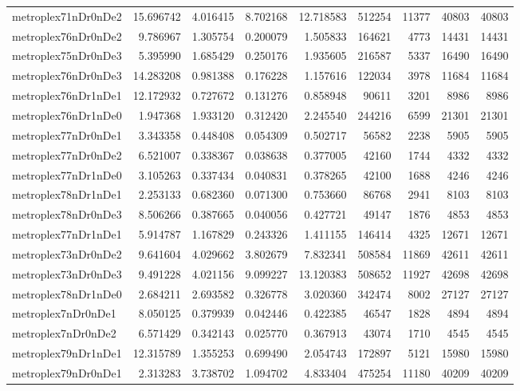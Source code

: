 \documentclass[../../../thesis.tex]{subfiles}
\begin{document}
\begin{longtable}{|l|r|r|r|r|r|r|r|r|}
metroplex71nDr0nDe2 & 15.696742 & 4.016415 & 8.702168 & 12.718583 & 512254 & 11377 & 40803 & 40803 \\
metroplex76nDr0nDe2 & 9.786967 & 1.305754 & 0.200079 & 1.505833 & 164621 & 4773 & 14431 & 14431 \\
metroplex75nDr0nDe3 & 5.395990 & 1.685429 & 0.250176 & 1.935605 & 216587 & 5337 & 16490 & 16490 \\
metroplex76nDr0nDe3 & 14.283208 & 0.981388 & 0.176228 & 1.157616 & 122034 & 3978 & 11684 & 11684 \\
metroplex76nDr1nDe1 & 12.172932 & 0.727672 & 0.131276 & 0.858948 & 90611 & 3201 & 8986 & 8986 \\
metroplex76nDr1nDe0 & 1.947368 & 1.933120 & 0.312420 & 2.245540 & 244216 & 6599 & 21301 & 21301 \\
metroplex77nDr0nDe1 & 3.343358 & 0.448408 & 0.054309 & 0.502717 & 56582 & 2238 & 5905 & 5905 \\
metroplex77nDr0nDe2 & 6.521007 & 0.338367 & 0.038638 & 0.377005 & 42160 & 1744 & 4332 & 4332 \\
metroplex77nDr1nDe0 & 3.105263 & 0.337434 & 0.040831 & 0.378265 & 42100 & 1688 & 4246 & 4246 \\
metroplex78nDr1nDe1 & 2.253133 & 0.682360 & 0.071300 & 0.753660 & 86768 & 2941 & 8103 & 8103 \\
metroplex78nDr0nDe3 & 8.506266 & 0.387665 & 0.040056 & 0.427721 & 49147 & 1876 & 4853 & 4853 \\
metroplex77nDr1nDe1 & 5.914787 & 1.167829 & 0.243326 & 1.411155 & 146414 & 4325 & 12671 & 12671 \\
metroplex73nDr0nDe2 & 9.641604 & 4.029662 & 3.802679 & 7.832341 & 508584 & 11869 & 42611 & 42611 \\
metroplex73nDr0nDe3 & 9.491228 & 4.021156 & 9.099227 & 13.120383 & 508652 & 11927 & 42698 & 42698 \\
metroplex78nDr1nDe0 & 2.684211 & 2.693582 & 0.326778 & 3.020360 & 342474 & 8002 & 27127 & 27127 \\
metroplex7nDr0nDe1 & 8.050125 & 0.379939 & 0.042446 & 0.422385 & 46547 & 1828 & 4894 & 4894 \\
metroplex7nDr0nDe2 & 6.571429 & 0.342143 & 0.025770 & 0.367913 & 43074 & 1710 & 4545 & 4545 \\
metroplex79nDr1nDe1 & 12.315789 & 1.355253 & 0.699490 & 2.054743 & 172897 & 5121 & 15980 & 15980 \\
metroplex79nDr0nDe1 & 2.313283 & 3.738702 & 1.094702 & 4.833404 & 475254 & 11180 & 40209 & 40209 \\

\end{longtable}
\end{document}

